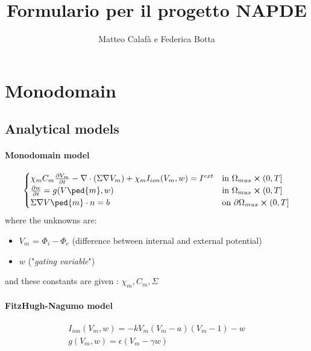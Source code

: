 \documentclass[a4paper]{article}
\begin{document}
\title{Formulario per il progetto NAPDE}
\author{Matteo Calafà e Federica Botta}
\maketitle
\vspace{5mm}
\section{Monodomain}
\vspace{5mm}
\subsection{Analytical models}
\vspace{5mm}
\paragraph{Monodomain model}
	\begin{equation}
	\begin{cases}
	\chi_m C_m\pdv{V_m}{t} - \nabla \cdot (\Sigma \nabla V_m) + \chi_m I_{ion}(V_m,w) = I^{ext}    & \text{in } \Omega_{mus} \cross (0,T]
	\\
	\pdv{w}{t} = g(V\ped{m}, w)  & \text{in } \Omega_{mus} \cross (0,T]
	\\
	\Sigma\nabla V\ped{m} \cdot n = b   & \text{on } \partial \Omega_{mus} \cross (0,T]
	\end{cases}
	\end{equation}
	\vspace{4mm}\newline
	where the unknowns are:
	\begin{itemize}
		\item $V_m$ = $\Phi_i - \Phi_e$ (difference between internal and external potential)
		\item $w$  ("\emph{gating variable}")
	\end{itemize}
    and these constants are given : $\chi_m, C_m, \Sigma$



\paragraph{FitzHugh-Nagumo model}
\begin{equation}
\begin{gathered}
I_{ion}(V_m, w) = -kV_m(V_m-a)(V_m-1) -w
\\
g(V_m,w) = \epsilon(V_m -\gamma w)
\end{gathered}
\end{equation}
\end{document}
